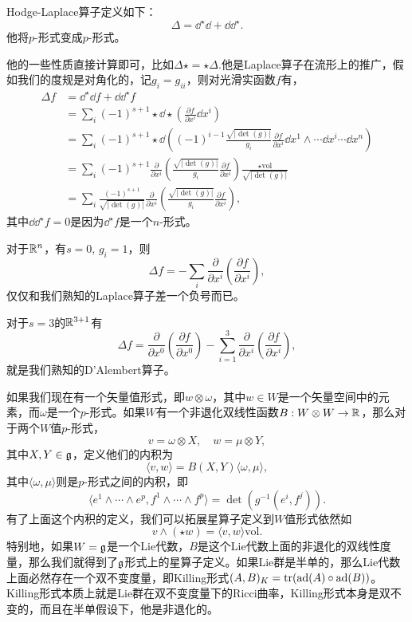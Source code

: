 \para Hodge-Laplace算子定义如下：
\[
	\Delta=\dd^\star\dd+\dd\dd^\star.
\]
他将$p$-形式变成$p$-形式。

他的一些性质直接计算即可，比如$\Delta\star=\star\Delta$.他是Laplace算子在流形上的推广，假如我们的度规是对角化的，记$g_i=g_{i i}$，则对光滑实函数$f$有，
\begin{align*}
	\Delta f&=\dd^\star\dd f+\dd\dd^\star f\\
	&=\sum_i(-1)^{s+1}\star\dd\star\left(\frac{\partial f}{\partial x^i}\dd x^i\right)\\
	&=\sum_i(-1)^{s+1}\star\dd\left((-1)^{i-1}\frac{\sqrt{|\det(g)|}}{g_i} \frac{\partial f}{\partial x^i}\dd x^1\wedge\cdots\hat{\dd x^i}\cdots\dd x^n\right)\\
	&=\sum_i(-1)^{s+1}\frac{\partial}{\partial x^i}\left(\frac{\sqrt{|\det(g)|}}{g_i} \frac{\partial f}{\partial x^i}\right)\frac{\star\mathrm{vol}}{\sqrt{|\det(g)|}}\\
	&=\sum_i\frac{(-1)^{s+1}}{\sqrt{|\det(g)|}}\frac{\partial}{\partial x^i}\left(\frac{\sqrt{|\det(g)|}}{g_i} \frac{\partial f}{\partial x^i}\right),
\end{align*}
其中$\dd\dd^\star f=0$是因为$\dd^\star f$是一个$n$-形式。

对于$\mathbb{R}^n$，有$s=0$, $g_i=1$，则
\[
	\Delta f=-\sum_i\frac{\partial}{\partial x^i}\left(\frac{\partial f}{\partial x^i}\right),
\]
仅仅和我们熟知的Laplace算子差一个负号而已。

对于$s=3$的$\mathbb{R}^{3+1}$有
\[
	\Delta f=\frac{\partial}{\partial x^0}\left(\frac{\partial f}{\partial x^0}\right)-\sum_{i=1}^3\frac{\partial}{\partial x^i}\left(\frac{\partial f}{\partial x^i}\right),
\]
就是我们熟知的D'Alembert算子。

如果我们现在有一个矢量值形式，即$w\otimes \omega$，其中$w\in W$是一个矢量空间中的元素，而$\omega$是一个$p$-形式。如果$W$有一个非退化双线性函数$B:W\otimes W\to \mathbb{R}$，那么对于两个$W$值$p$-形式，
\[
	v=\omega\otimes X,\quad w=\mu\otimes Y,
\]
其中$X,Y\in {\mathfrak{g}}$，定义他们的内积为
\[
	\langle v,w\rangle=B(X,Y) \langle\omega,\mu\rangle,
\]
其中$\langle\omega,\mu\rangle$则是$p$-形式之间的内积，即
\[
	\langle e^1\wedge\cdots \wedge e^p,f^1\wedge\cdots \wedge f^p\rangle =\det(g^{-1}(e^i,f^j)).
\]
有了上面这个内积的定义，我们可以拓展星算子定义到$W$值形式依然如
\[
	v\wedge(\star w)=\langle v,w\rangle \mathrm{vol}.
\]
特别地，如果$W={\mathfrak{g}}$是一个Lie代数，$B$是这个Lie代数上面的非退化的双线性度量，那么我们就得到了${\mathfrak{g}}$形式上的星算子定义。如果Lie群是半单的，那么Lie代数上面必然存在一个双不变度量，即Killing形式$(A,B)_K=\operatorname{tr}(\operatorname{ad}(A)\circ \operatorname{ad}(B))$。Killing形式本质上就是Lie群在双不变度量下的Ricci曲率，Killing形式本身是双不变的，而且在半单假设下，他是非退化的。


